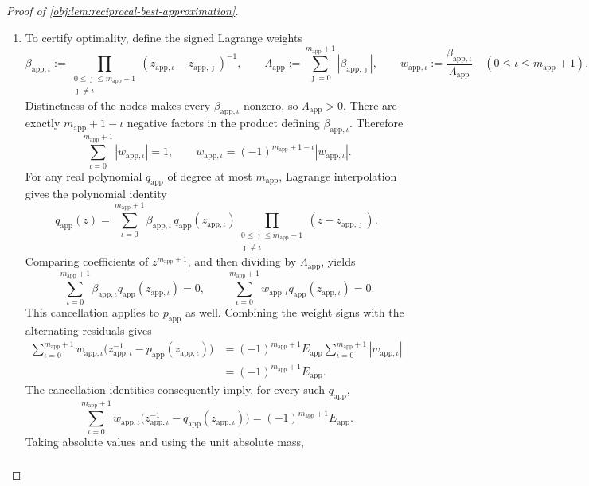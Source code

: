 \begin{proof}[Proof of \cref{obj:lem:reciprocal-best-approximation}]
\begin{enumerate}
\item To certify optimality, define the signed Lagrange weights
\[
\beta_{\mathrm{app},\iota}:=
\prod_{\substack{0\le\jmath\le m_{\mathrm{app}}+1\\\jmath\ne\iota}}
(z_{\mathrm{app},\iota}-z_{\mathrm{app},\jmath})^{-1},
\qquad
\Lambda_{\mathrm{app}}:=
\sum_{\jmath=0}^{m_{\mathrm{app}}+1}
|\beta_{\mathrm{app},\jmath}|,
\qquad
w_{\mathrm{app},\iota}:=
\frac{\beta_{\mathrm{app},\iota}}{\Lambda_{\mathrm{app}}}
\quad(0\le\iota\le m_{\mathrm{app}}+1).
\]
Distinctness of the nodes makes every \(\beta_{\mathrm{app},\iota}\) nonzero, so \(\Lambda_{\mathrm{app}}>0\). There are exactly
\(m_{\mathrm{app}}+1-\iota\) negative factors in the product defining
\(\beta_{\mathrm{app},\iota}\). Therefore
\[
\sum_{\iota=0}^{m_{\mathrm{app}}+1}|w_{\mathrm{app},\iota}|=1,
\qquad
w_{\mathrm{app},\iota}
=
(-1)^{m_{\mathrm{app}}+1-\iota}
|w_{\mathrm{app},\iota}|.
\]
For any real polynomial \(q_{\mathrm{app}}\) of degree at most
\(m_{\mathrm{app}}\), Lagrange interpolation gives the polynomial identity
\[
q_{\mathrm{app}}(z)
=
\sum_{\iota=0}^{m_{\mathrm{app}}+1}
\beta_{\mathrm{app},\iota}\,
q_{\mathrm{app}}(z_{\mathrm{app},\iota})
\prod_{\substack{0\le\jmath\le m_{\mathrm{app}}+1\\\jmath\ne\iota}}
(z-z_{\mathrm{app},\jmath}).
\]
Comparing coefficients of \(z^{m_{\mathrm{app}}+1}\), and then dividing by
\(\Lambda_{\mathrm{app}}\), yields
\[
\sum_{\iota=0}^{m_{\mathrm{app}}+1}
\beta_{\mathrm{app},\iota}
q_{\mathrm{app}}(z_{\mathrm{app},\iota})=0,
\qquad
\sum_{\iota=0}^{m_{\mathrm{app}}+1}
w_{\mathrm{app},\iota}
q_{\mathrm{app}}(z_{\mathrm{app},\iota})=0.
\]
This cancellation applies to \(p_{\mathrm{app}}\) as well. Combining the weight signs with the alternating residuals gives
\[
\begin{aligned}
\sum_{\iota=0}^{m_{\mathrm{app}}+1}
w_{\mathrm{app},\iota}
\bigl(z_{\mathrm{app},\iota}^{-1}
-p_{\mathrm{app}}(z_{\mathrm{app},\iota})\bigr)
&=
(-1)^{m_{\mathrm{app}}+1}E_{\mathrm{app}}
\sum_{\iota=0}^{m_{\mathrm{app}}+1}
|w_{\mathrm{app},\iota}|\\
&=(-1)^{m_{\mathrm{app}}+1}E_{\mathrm{app}}.
\end{aligned}
\]
The cancellation identities consequently imply, for every such
\(q_{\mathrm{app}}\),
\[
\sum_{\iota=0}^{m_{\mathrm{app}}+1}
w_{\mathrm{app},\iota}
\bigl(z_{\mathrm{app},\iota}^{-1}
-q_{\mathrm{app}}(z_{\mathrm{app},\iota})\bigr)
=
(-1)^{m_{\mathrm{app}}+1}E_{\mathrm{app}}.
\]
Taking absolute values and using the unit absolute mass,
\[
\begin{aligned}

\end{aligned}\]
\end{enumerate}
\end{proof}
